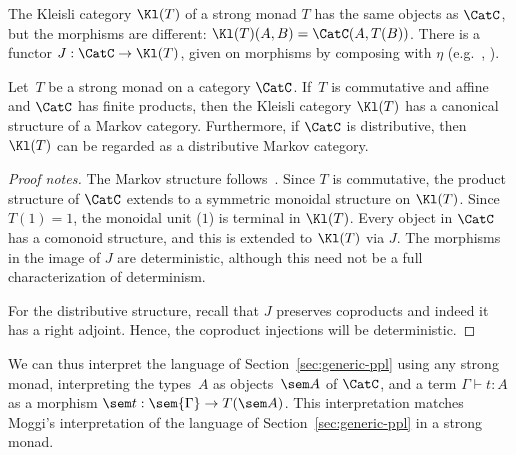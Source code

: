 The Kleisli category $\Kl(T)$ of a strong monad $T$ has the same objects as $\CatC$,
but the morphisms are different: $\Kl(T)(A,B)=\CatC(A,T(B))$.
There is a functor $J:\CatC\to\Kl(T)$, given on morphisms by composing
with $\eta$ (e.g.~\cite[\S VI.5]{maclane}, \cite{moggi-computational-lambda}).
\begin{proposition}\label{prop:distr-affine-monad}
        Let\, $T$ be a strong monad on a category $\CatC$. If\, $T$ is commutative
        and affine and $\CatC$ has finite products, then
the Kleisli category $\Kl(T)$ has a canonical structure of a Markov
category. Furthermore, if $\CatC$ is distributive, then $\Kl(T)$ can be regarded as a distributive Markov category. 
\end{proposition}
\begin{proof}[Proof notes]
  The Markov structure follows~\cite[\S3]{fritz}. Since $T$ is commutative, the product structure of $\CatC$ extends
  to a symmetric monoidal structure on $\Kl(T)$.
  Since $T(1)=1$, the monoidal unit ($1$) is terminal in $\Kl(T)$.
  Every object in $\CatC$ has a comonoid structure, and this is
  extended to $\Kl(T)$ via $J$. 
  The morphisms in the image of $J$ are deterministic, although this
  need not be a full characterization of determinism.
  
  For the distributive structure, recall that $J$ preserves
  coproducts and indeed it has a right adjoint. Hence, the coproduct injections will be deterministic.
\end{proof}
We can thus interpret the language of Section~\ref{sec:generic-ppl} using any
strong monad, interpreting the types~$A$ as objects~$\sem A$ of $\CatC$,
and a term $\Gamma\vdash t:A$ as a morphism
$\sem t:\sem{\Gamma} \to T(\sem A)$.
This interpretation matches Moggi's interpretation of the language of Section~\ref{sec:generic-ppl} in a strong monad. 

